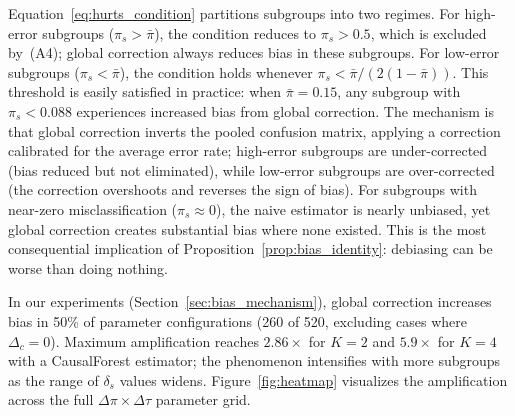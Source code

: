 Equation~\eqref{eq:hurts_condition} partitions subgroups into two regimes.
For high-error subgroups ($\pi_s > \bar{\pi}$), the condition reduces to $\pi_s > 0.5$, which is excluded by~(A4); global correction always reduces bias in these subgroups.
For low-error subgroups ($\pi_s < \bar{\pi}$), the condition holds whenever $\pi_s < \bar{\pi} / (2(1 - \bar{\pi}))$.
This threshold is easily satisfied in practice: when $\bar{\pi} = 0.15$, any subgroup with $\pi_s < 0.088$ experiences increased bias from global correction.
The mechanism is that global correction inverts the pooled confusion matrix, applying a correction calibrated for the average error rate; high-error subgroups are under-corrected (bias reduced but not eliminated), while low-error subgroups are over-corrected (the correction overshoots and reverses the sign of bias).
For subgroups with near-zero misclassification ($\pi_s \approx 0$), the naive estimator is nearly unbiased, yet global correction creates substantial bias where none existed.
This is the most consequential implication of Proposition~\ref{prop:bias_identity}: debiasing can be worse than doing nothing.

In our experiments (Section~\ref{sec:bias_mechanism}), global correction increases bias in 50\% of parameter configurations (260 of 520, excluding cases where $\Delta_c{=}0$).
Maximum amplification reaches $2.86\times$ for $K{=}2$ and $5.9\times$ for $K{=}4$ with a CausalForest estimator; the phenomenon intensifies with more subgroups as the range of $\delta_s$ values widens.
Figure~\ref{fig:heatmap} visualizes the amplification across the full $\Delta\pi \times \Delta\tau$ parameter grid.
